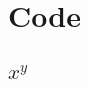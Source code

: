 \documentclass[11pt]{article}
\begin{document}
\section{Code}
\subsection{$x^{y}$}


\subsection{}
\end{document}
